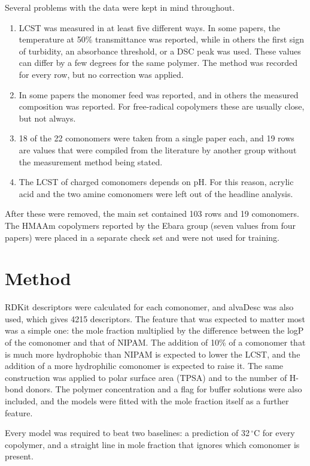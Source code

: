 \documentclass[11pt,a4paper]{article}
\newcommand{\degC}{\ensuremath{^{\circ}}C}
\begin{document}
Several problems with the data were kept in mind throughout.

\begin{enumerate}
  \item LCST was measured in at least five different ways. In some papers, the
  temperature at 50\% transmittance was reported, while in others the first sign of
  turbidity, an absorbance threshold, or a DSC peak was used. These values can differ
  by a few degrees for the same polymer. The method was recorded for every row, but
  no correction was applied.
  \item In some papers the monomer feed was reported, and in others the measured
  composition was reported. For free-radical copolymers these are usually close, but
  not always.
  \item 18 of the 22 comonomers were taken from a single paper each, and 19 rows are
  values that were compiled from the literature by another group without the
  measurement method being stated.
  \item The LCST of charged comonomers depends on pH. For this reason, acrylic acid
  and the two amine comonomers were left out of the headline analysis.
\end{enumerate}

After these were removed, the main set contained 103 rows and 19 comonomers. The
HMAAm copolymers reported by the Ebara group (seven values from four papers) were
placed in a separate check set and were not used for training.

\section{Method}

RDKit descriptors were calculated for each comonomer, and alvaDesc was also used,
which gives 4215 descriptors. The feature that was expected to matter most was a
simple one: the mole fraction multiplied by the difference between the logP of the
comonomer and that of NIPAM. The addition of 10\% of a comonomer that is much more
hydrophobic than NIPAM is expected to lower the LCST, and the addition of a more
hydrophilic comonomer is expected to raise it. The same construction was applied to
polar surface area (TPSA) and to the number of H-bond donors. The polymer
concentration and a flag for buffer solutions were also included, and the models were
fitted with the mole fraction itself as a further feature.

Every model was required to beat two baselines: a prediction of 32\,\degC{} for every
copolymer, and a straight line in mole fraction that ignores which comonomer is
present.
\end{document}
